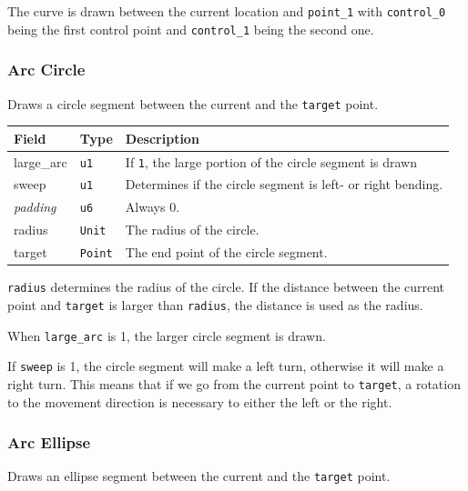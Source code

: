 \documentclass[]{article}
\begin{document}
The curve is drawn between the current location and \texttt{point\_1}
with \texttt{control\_0} being the first control point and
\texttt{control\_1} being the second one.

\hypertarget{arc-circle}{\subsubsection{Arc Circle}\label{arc-circle}}

Draws a circle segment between the current and the \texttt{target}
point.

\begin{longtable}[]{@{}p{1in}p{0.5in}p{4.5in}@{}}
\toprule
Field & Type & Description \\
\midrule
\endhead
large\_arc     & \texttt{u1}    & If \texttt{1}, the large portion of the circle segment is drawn \\
sweep          & \texttt{u1}    & Determines if the circle segment is left- or right bending. \\
\emph{padding} & \texttt{u6}    & Always 0. \\
radius         & \texttt{Unit}  & The radius of the circle. \\
target         & \texttt{Point} & The end point of the circle segment. \\
\bottomrule
\end{longtable}

\texttt{radius} determines the radius of the circle. If the distance
between the current point and \texttt{target} is larger than
\texttt{radius}, the distance is used as the radius.

When \texttt{large\_arc} is 1, the larger circle segment is drawn.

If \texttt{sweep} is 1, the circle segment will make a left turn,
otherwise it will make a right turn. This means that if we go from the
current point to \texttt{target}, a rotation to the movement direction
is necessary to either the left or the right.

\hypertarget{arc-ellipse}{\subsubsection{Arc Ellipse}\label{arc-ellipse}}

Draws an ellipse segment between the current and the \texttt{target}
point.
\end{document}
